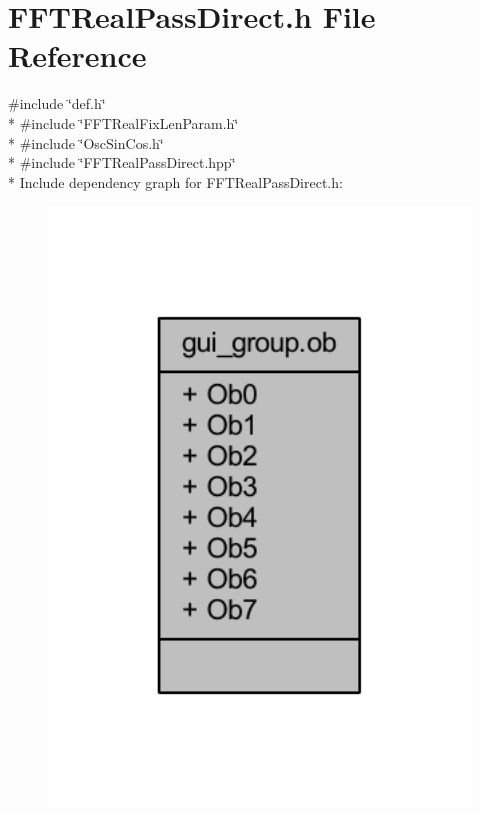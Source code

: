 \hypertarget{a00100}{\section{F\+F\+T\+Real\+Pass\+Direct.\+h File Reference}
\label{a00100}
}
{\ttfamily \#include \char`\"{}def.\+h\char`\"{}}\\*
{\ttfamily \#include \char`\"{}F\+F\+T\+Real\+Fix\+Len\+Param.\+h\char`\"{}}\\*
{\ttfamily \#include \char`\"{}Osc\+Sin\+Cos.\+h\char`\"{}}\\*
{\ttfamily \#include \char`\"{}F\+F\+T\+Real\+Pass\+Direct.\+hpp\char`\"{}}\\*
Include dependency graph for F\+F\+T\+Real\+Pass\+Direct.\+h\+:
\nopagebreak
\begin{figure}[H]
\begin{center}
\leavevmode
\includegraphics[width=350pt]{df/da9/a00263}
\end{center}
\end{figure}
